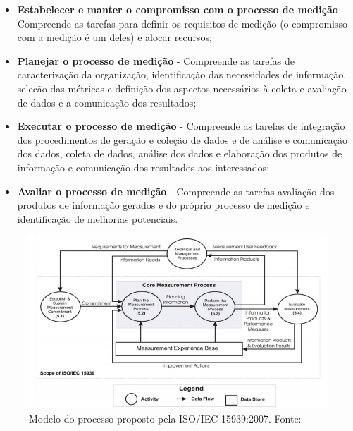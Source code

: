       \begin{itemize}

	\item \textbf{Estabelecer e manter o compromisso com o processo de medição} - Compreende as tarefas para definir os requisitos
	      de medição (o compromisso com a medição é um deles) e alocar recursos;

	\item \textbf{Planejar o processo de medição} - Compreende as tarefas de caracterização da organização, identificação das
	      necessidades de informação, selecão das métricas e definição dos aspectos necessários à coleta e avaliação de dados e
	      a comunicação dos resultados;

	\item \textbf{Executar o processo de medição} - Compreende as tarefas de integração dos procedimentos de geração e coleção
	      de dados e de análise e comunicação dos dados, coleta de dados, análise dos dados e elaboração dos produtos de
	      informação e comunicação dos resultados aos interessados;

	\item \textbf{Avaliar o processo de medição} - Compreende as tarefas avaliação dos produtos de informação gerados e do
	      próprio processo de medição e identificação de melhorias potenciais.

      \end{itemize}

      \begin{figure}[!htb]
	\centering
	\includegraphics[scale=0.55]{figuras/iso15939}
	\caption[Modelo do processo proposto pela ISO/IEC 15939:2007.]
		{Modelo do processo proposto pela ISO/IEC 15939:2007. Fonte: \cite{iso15939}}
	\label{iso15939_model}
      \end{figure}

